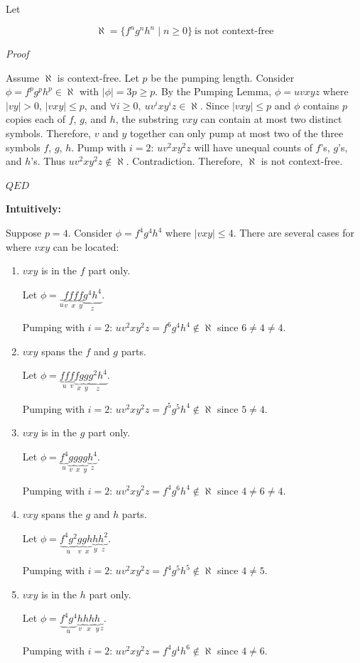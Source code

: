 \documentclass[12pt,a4paper,openany]{article}
\begin{document}
Let 

\[\aleph = \{f^n g^n h^n \mid n \geq 0\} \ \text{is not context-free}\]

\emph{Proof}

Assume $\aleph$ is context-free. Let $p$ be the pumping length. 
Consider $\phi = f^p g^p h^p \in \aleph$ with $|\phi| = 3p \geq p$. 
By the Pumping Lemma, $\phi = uvxyz$ where $|vy| > 0$, $|vxy| \leq p$, and $\forall i \geq 0, \ uv^ixy^iz \in \aleph$. 
Since $|vxy| \leq p$ and $\phi$ contains $p$ copies each of $f$, $g$, and $h$, the substring $vxy$ can contain at most two distinct symbols. Therefore, $v$ and $y$ together can only pump at most two of the three symbols $f$, $g$, $h$. 
Pump with $i = 2$: $uv^2xy^2z$ will have unequal counts of $f$'s, $g$'s, and $h$'s. Thus $uv^2xy^2z \notin \aleph$. Contradiction. Therefore, $\aleph$ is not context-free.

\hfill $QED$

\textbf{Intuitively:}

Suppose $p = 4$. Consider $\phi = f^4g^4h^4$ where $|vxy| \leq 4$. There are several cases for where $vxy$ can be located:

\begin{enumerate}
    \item $vxy$ is in the $f$ part only.
    
    Let $\phi = \underbrace{}_u \underbrace{f}_v \underbrace{ff}_x \underbrace{f}_y \underbrace{g^4h^4}_z$.

    Pumping with $i = 2$: $uv^2xy^2z = f^{6}g^4h^4 \notin \aleph$ since $6 \neq 4 \neq 4$. 
    
    
    \item $vxy$ spans the $f$ and $g$ parts.
    
    Let $\phi = \underbrace{ff}_u \underbrace{f}_v \underbrace{fg}_x \underbrace{g}_y \underbrace{g^2h^4}_z$.
    
    Pumping with $i = 2$: $uv^2xy^2z = f^{5}g^{5}h^4 \notin \aleph$ since $5 \neq 4$. 
    
    
    \item $vxy$ is in the $g$ part only.
    
    Let $\phi = \underbrace{f^4}_u \underbrace{g}_v \underbrace{gg}_x \underbrace{g}_y \underbrace{h^4}_z$.
    
    Pumping with $i = 2$: $uv^2xy^2z = f^4g^{6}h^4 \notin \aleph$ since $4 \neq 6 \neq 4$. 
    
    \item $vxy$ spans the $g$ and $h$ parts.
    
    Let $\phi = \underbrace{f^4g^2}_u \underbrace{g}_v \underbrace{gh}_x \underbrace{h}_y \underbrace{h^2}_z$.
    
    Pumping with $i = 2$: $uv^2xy^2z = f^4g^{5}h^{5} \notin \aleph$ since $4 \neq 5$. 
    
    \item $vxy$ is in the $h$ part only.
    
    Let $\phi = \underbrace{f^4g^4}_u \underbrace{h}_v \underbrace{hh}_x \underbrace{h}_y \underbrace{}_z$.
    
    Pumping with $i = 2$: $uv^2xy^2z = f^4g^4h^{6} \notin \aleph$ since $4 \neq 6$. 
\end{enumerate}
\end{document}
